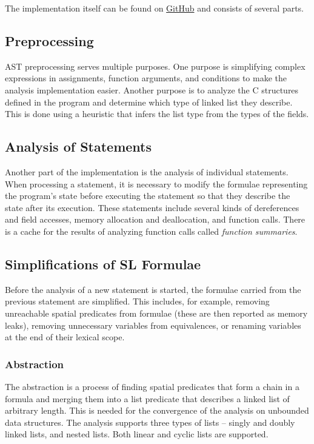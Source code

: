 \documentclass{ExcelAtFIT}
\begin{document}
The implementation itself can be found on \href{https://github.com/pepega007xd/slplugin}{GitHub} and consists of several parts. 

\subsection{Preprocessing}
AST preprocessing serves multiple purposes. One purpose is simplifying complex expressions in assignments, function arguments, and conditions to make the analysis implementation easier. Another purpose is to analyze the C structures defined in the program and determine which type of linked list they describe. This is done using a heuristic that infers the list type from the types of the fields.

\subsection{Analysis of Statements} 
Another part of the implementation is the analysis of individual statements. When processing a statement, it is necessary to modify the formulae representing the program's state before executing the statement so that they describe the state after its execution. These statements include several kinds of dereferences and field accesses, memory allocation and deallocation, and function calls. There is a cache for the results of analyzing function calls called \textit{function summaries}. 

\subsection{Simplifications of SL Formulae}
Before the analysis of a new statement is started, the formulae carried from the previous statement are simplified. This includes, for example, removing unreachable spatial predicates from formulae (these are then reported as memory leaks), removing unnecessary variables from equivalences, or renaming variables at the end of their lexical scope.

\subsubsection{Abstraction}
The abstraction is a process of finding spatial predicates that form a chain in a formula and merging them into a list predicate that describes a linked list of arbitrary length. This is needed for the convergence of the analysis on unbounded data structures. The analysis supports three types of lists -- singly and doubly linked lists, and nested lists. Both linear and cyclic lists are supported.
\end{document}
